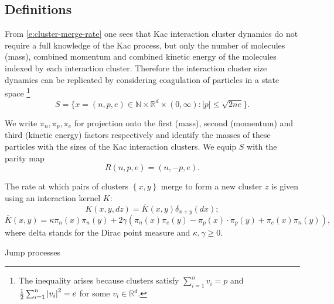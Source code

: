 \subsection{Definitions}
From \eqref{e:cluster-merge-rate} one sees that Kac interaction cluster dynamics do not require a full knowledge of the Kac process, but only the number of molecules (mass), combined momentum and combined kinetic energy of the molecules indexed by each interaction cluster.
Therefore the interaction cluster size dynamics can be replicated by considering coagulation of particles in a state space
\footnote{The inequality arises because clusters satisfy $\sum_{i=1}^n v_i = p$ and $\frac12 \sum_{i=1}^n \left\lvert{v_i}\right\rvert^2 = e$ for some $v_i \in \mathbb{R}^d$.}
\begin{equation}
    S=\{x=(n, p, e) \in \mathbb{N}\times \mathbb{R}^d\times (0,\infty): |p|\leq \sqrt{2ne} \}.
\end{equation}

We write $\pi_n, \pi_p, \pi_e$ for projection onto the first (mass), second (momentum) and third (kinetic energy) factors respectively and identify the masses of these particles with the sizes of the Kac interaction clusters. We equip $S$ with the parity map \begin{equation*}
    R(n,p,e)=(n,-p,e).
\end{equation*}


The rate at which pairs of clusters $\left\{ x,y \right\}$ merge to form a new cluster $z$ is given using an interaction kernel $K$:
\begin{equation}
    K(x,y,dz)=\overline{K}(x,y)\delta_{x+y}(dx);
    \end{equation} \begin{equation} \overline{K}(x,y)=\kappa \pi_n(x)\pi_n(y)+2\gamma\left(\pi_n(x)\pi_e(y)-\pi_p(x)\cdot \pi_p(y)+\pi_e(x)\pi_n(y)\right),
\end{equation}
where delta stands for the Dirac point measure and $\kappa, \gamma\ge 0$. 

Jump processes

